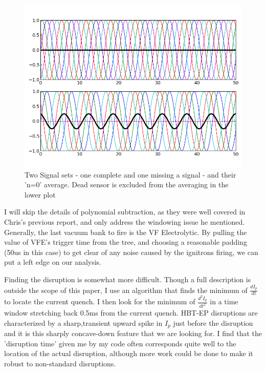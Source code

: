 \documentclass{article}
\begin{document}
\begin{center}
\begin{figure}[h]
\includegraphics[width = \textwidth]{./Report_pic_minus_n0_sig.png}\caption{Two Signal sets - one complete and one missing a signal - and their 'n=0' average.  \newline
Dead sensor is excluded from the averaging in the lower plot}
\label{n0_sig}
\end{figure}
\end{center}
\par
I will skip the details of polynomial subtraction, as they were well covered in Chris's previous report, and only address the windowing issue he mentioned. Generally, the last vacuum bank to fire is the VF Electrolytic.  By pulling the value of VFE's trigger time from the tree, and choosing a reasonable padding (50us in this case) to get clear of any noise caused by the ignitrons firing, we can put a left edge on our analysis.\par
Finding the disruption is somewhat more difficult.  Though a full description is outside the scope of this paper, I use an algorithm that finds the minimum of $\frac{dI_p}{dt}$ to locate the current quench.  I then look for the minimum of $\frac{d^2I_p}{dt^2}$ in a time window stretching back 0.5ms from the current quench.  HBT-EP disruptions are characterized by a sharp,transient upward spike in $I_p$ just before the disruption and it is this sharply concave-down feature that we are looking for.  I find that the 'disruption time' given me by my code often corresponds quite well to the location of the actual disruption, although more work could be done to make it robust to non-standard disruptions.
\end{document}
